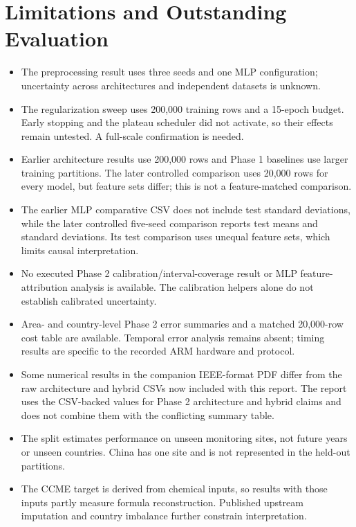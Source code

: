 \documentclass[conference]{IEEEtran}
\begin{document}
\section{Limitations and Outstanding Evaluation}
\label{sec:limitations}
\begin{itemize}
\item The preprocessing result uses three seeds and one MLP configuration; uncertainty across architectures and independent datasets is unknown.
\item The regularization sweep uses 200,000 training rows and a 15-epoch budget. Early stopping and the plateau scheduler did not activate, so their effects remain untested. A full-scale confirmation is needed.
\item Earlier architecture results use 200,000 rows and Phase 1 baselines use larger training partitions. The later controlled comparison uses 20,000 rows for every model, but feature sets differ; this is not a feature-matched comparison.
\item The earlier MLP comparative CSV does not include test standard deviations, while the later controlled five-seed comparison reports test means and standard deviations. Its test comparison uses unequal feature sets, which limits causal interpretation.
\item No executed Phase 2 calibration/interval-coverage result or MLP feature-attribution analysis is available. The calibration helpers alone do not establish calibrated uncertainty.
\item Area- and country-level Phase 2 error summaries and a matched 20,000-row cost table are available. Temporal error analysis remains absent; timing results are specific to the recorded ARM hardware and protocol.
\item Some numerical results in the companion IEEE-format PDF differ from the raw architecture and hybrid CSVs now included with this report. The report uses the CSV-backed values for Phase 2 architecture and hybrid claims and does not combine them with the conflicting summary table.
\item The split estimates performance on unseen monitoring sites, not future years or unseen countries. China has one site and is not represented in the held-out partitions.
\item The CCME target is derived from chemical inputs, so results with those inputs partly measure formula reconstruction. Published upstream imputation and country imbalance further constrain interpretation.
\end{itemize}
\end{document}
